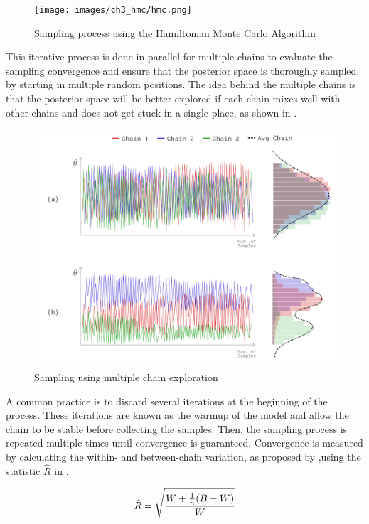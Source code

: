 \begin{figure}[H]
    \centering
    \texttt{[image: images/ch3\_hmc/hmc.png]}
    \caption{Sampling process using the Hamiltonian Monte Carlo Algorithm}
    \label{fig:hmc}
\end{figure}

This iterative process is done in parallel for multiple chains to evaluate the sampling convergence and ensure that the posterior space is thoroughly sampled by starting in multiple random positions. The idea behind the multiple chains is that the posterior space will be better explored if each chain mixes well with other chains and does not get stuck in a single place, as shown in . 

\begin{figure}[H]
    \centering
    \includegraphics[width=1.0\textwidth]{images/ch3_chain_mix/chain_mix.png}
    \caption{Sampling using multiple chain exploration}
    \label{fig:chains}
\end{figure}

A common practice is to discard several iterations at the beginning of the process. These iterations are known as the warmup of the model and allow the chain to be stable before collecting the samples. Then, the sampling process is repeated multiple times until convergence is guaranteed. Convergence is measured by calculating the within- and between-chain variation, as proposed by \citet{Gelman1992},using the statistic $\hat{R}$ in .

\begin{equation}\label{eq:r_hat}
    \hat{R} = \sqrt{\frac{W+{\frac{1}{n}}(B-W)}{W}}\\
\end{equation}

